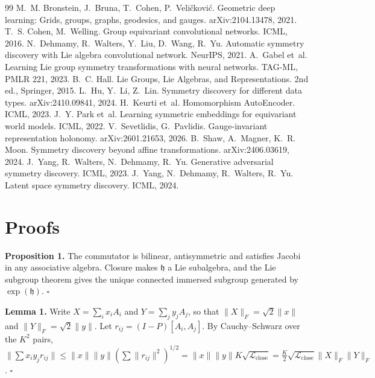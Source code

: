 \documentclass[10pt]{article}
\newcommand{\Lclose}{\mathcal{L}_{\mathrm{close}}}
\begin{document}

\begin{thebibliography}{99}
 M.~M. Bronstein, J.~Bruna, T.~Cohen, P.~Veli\v{c}kovi\'c. Geometric deep learning: Grids, groups, graphs, geodesics, and gauges. arXiv:2104.13478, 2021.
 T.~S. Cohen, M.~Welling. Group equivariant convolutional networks. ICML, 2016.
 N.~Dehmamy, R.~Walters, Y.~Liu, D.~Wang, R.~Yu. Automatic symmetry discovery with Lie algebra convolutional network. NeurIPS, 2021.
 A.~Gabel et~al. Learning Lie group symmetry transformations with neural networks. TAG-ML, PMLR 221, 2023.
 B.~C. Hall. Lie Groups, Lie Algebras, and Representations. 2nd ed., Springer, 2015.
 L.~Hu, Y.~Li, Z.~Lin. Symmetry discovery for different data types. arXiv:2410.09841, 2024.
 H.~Keurti et~al. Homomorphism AutoEncoder. ICML, 2023.
 J.~Y. Park et~al. Learning symmetric embeddings for equivariant world models. ICML, 2022.
 V.~Sevetlidis, G.~Pavlidis. Gauge-invariant representation holonomy. arXiv:2601.21653, 2026.
 B.~Shaw, A.~Magner, K.~R. Moon. Symmetry discovery beyond affine transformations. arXiv:2406.03619, 2024.
 J.~Yang, R.~Walters, N.~Dehmamy, R.~Yu. Generative adversarial symmetry discovery. ICML, 2023.
 J.~Yang, N.~Dehmamy, R.~Walters, R.~Yu. Latent space symmetry discovery. ICML, 2024.
\end{thebibliography}

\appendix
\section{Proofs}
\textbf{Proposition 1.} The commutator is bilinear, antisymmetric and satisfies Jacobi in any associative algebra.
Closure makes $\mathfrak h$ a Lie subalgebra, and the Lie subgroup theorem \citep{hall2015} gives the unique
connected immersed subgroup generated by $\exp(\mathfrak h)$. \hfill$\square$

\textbf{Lemma 1.} Write $X=\sum_ix_iA_i$ and $Y=\sum_jy_jA_j$, so that $\|X\|_F=\sqrt2\|x\|$ and
$\|Y\|_F=\sqrt2\|y\|$. Let $r_{ij}=(I-P)[A_i,A_j]$. By Cauchy--Schwarz over the $K^2$ pairs,
$\|\sum x_iy_jr_{ij}\|\le\|x\|\|y\|(\sum\|r_{ij}\|^2)^{1/2}=\|x\|\|y\|K\sqrt{\Lclose}=\tfrac K2\sqrt{\Lclose}\|X\|_F\|Y\|_F$. \hfill$\square$
\end{document}
